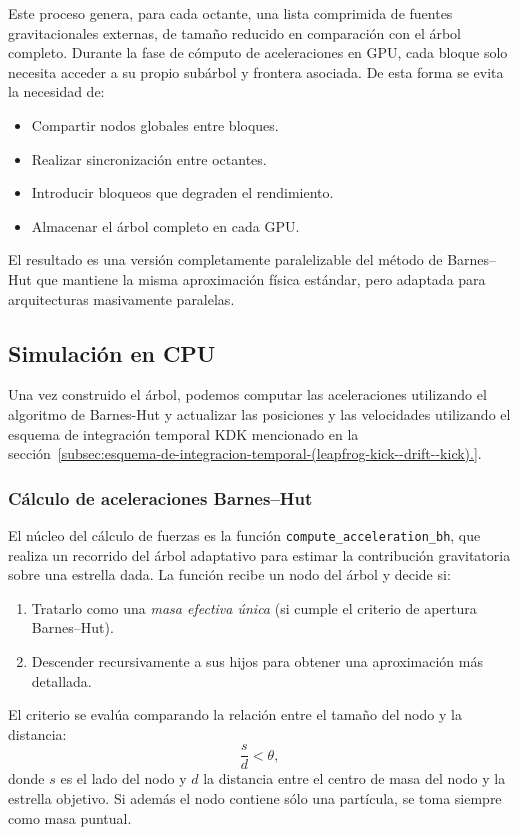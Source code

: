 Este proceso genera, para cada octante, una lista comprimida de fuentes gravitacionales externas, de tamaño reducido en comparación con el árbol completo.
Durante la fase de cómputo de aceleraciones en GPU, cada bloque solo necesita acceder a su propio subárbol y frontera asociada.
De esta forma se evita la necesidad de:
\begin{itemize}
    \item Compartir nodos globales entre bloques.
    \item Realizar sincronización entre octantes.
    \item Introducir bloqueos que degraden el rendimiento.
    \item Almacenar el árbol completo en cada GPU.
\end{itemize}

El resultado es una versión completamente paralelizable del método de Barnes--Hut que mantiene la misma aproximación física estándar, pero adaptada para arquitecturas masivamente paralelas.

\subsection{Simulación en CPU}\label{subsec:simulacion-cpu}
Una vez construido el árbol, podemos computar las aceleraciones utilizando el algoritmo de Barnes-Hut y actualizar las posiciones y las velocidades utilizando el esquema de integración temporal KDK mencionado en la sección~\ref{subsec:esquema-de-integracion-temporal-(leapfrog-kick--drift--kick).}.

\subsubsection{Cálculo de aceleraciones Barnes--Hut}
El núcleo del cálculo de fuerzas es la función \texttt{compute\_acceleration\_bh}, que realiza un recorrido del árbol adaptativo para estimar la contribución gravitatoria sobre una estrella dada.
La función recibe un nodo del árbol y decide si:
\begin{enumerate}
    \item Tratarlo como una \emph{masa efectiva única} (si cumple el criterio de apertura Barnes--Hut).
    \item Descender recursivamente a sus hijos para obtener una aproximación más detallada.
\end{enumerate}

El criterio se evalúa comparando la relación entre el tamaño del nodo y la distancia:
\[
    \frac{s}{d} < \theta,
\]
donde $s$ es el lado del nodo y $d$ la distancia entre el centro de masa del nodo y la estrella objetivo.
Si además el nodo contiene sólo una partícula, se toma siempre como masa puntual.


